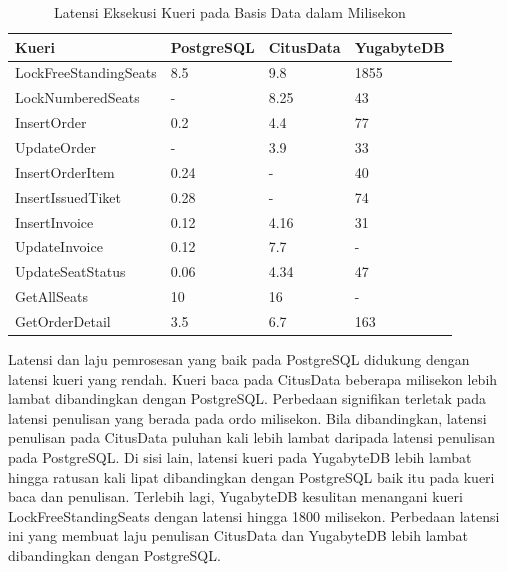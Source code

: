 \begin{table}[h]
    \centering
    \caption{Latensi Eksekusi Kueri pada Basis Data dalam Milisekon}
    \label{table:latensi-kueri}
    \begin{tabular}{|l|l|l|l|}
        \hline
        \textbf{Kueri}        & \textbf{PostgreSQL} & \textbf{CitusData} & \textbf{YugabyteDB} \\
        \hline
        LockFreeStandingSeats & 8.5                 & 9.8                & 1855                \\
        \hline
        LockNumberedSeats     & -                   & 8.25               & 43                  \\
        \hline
        InsertOrder           & 0.2                 & 4.4                & 77                  \\
        \hline
        UpdateOrder           & -                   & 3.9                & 33                  \\
        \hline
        InsertOrderItem       & 0.24                & -                  & 40                  \\
        \hline
        InsertIssuedTiket     & 0.28                & -                  & 74                  \\
        \hline
        InsertInvoice         & 0.12                & 4.16               & 31                  \\
        \hline
        UpdateInvoice         & 0.12                & 7.7                & -                   \\
        \hline
        UpdateSeatStatus      & 0.06                & 4.34               & 47                  \\
        \hline
        GetAllSeats           & 10                  & 16                 & -                   \\
        \hline
        GetOrderDetail        & 3.5                 & 6.7                & 163                 \\
        \hline
    \end{tabular}
\end{table}

Latensi dan laju pemrosesan yang baik pada PostgreSQL didukung dengan latensi kueri yang rendah. Kueri baca pada CitusData beberapa milisekon lebih lambat dibandingkan dengan PostgreSQL. Perbedaan signifikan terletak pada latensi penulisan yang berada pada ordo milisekon. Bila dibandingkan, latensi penulisan pada CitusData puluhan kali lebih lambat daripada latensi penulisan pada PostgreSQL. Di sisi lain, latensi kueri pada YugabyteDB lebih lambat hingga ratusan kali lipat dibandingkan dengan PostgreSQL baik itu pada kueri baca dan penulisan. Terlebih lagi, YugabyteDB kesulitan menangani kueri LockFreeStandingSeats dengan latensi hingga 1800 milisekon. Perbedaan latensi ini yang membuat laju penulisan CitusData dan YugabyteDB lebih lambat dibandingkan dengan PostgreSQL.

